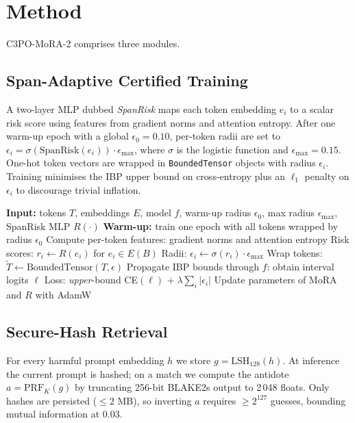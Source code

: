 \documentclass{article}
\begin{document}
\section{Method}
C3PO-MoRA-2 comprises three modules.

\subsection{Span-Adaptive Certified Training}
A two-layer MLP dubbed \textit{SpanRisk} maps each token embedding $e_i$ to a scalar risk score using features from gradient norms and attention entropy. After one warm-up epoch with a global $\epsilon_0 = 0.10$, per-token radii are set to $\epsilon_i = \sigma(\mathrm{SpanRisk}(e_i))\cdot\epsilon_{\max}$, where $\sigma$ is the logistic function and $\epsilon_{\max} = 0.15$. One-hot token vectors are wrapped in \texttt{BoundedTensor} objects with radius $\epsilon_i$. Training minimises the IBP upper bound on cross-entropy plus an $\ell_1$ penalty on $\epsilon_i$ to discourage trivial inflation.

\begin{algorithm}[H]
\caption{Span-Adaptive Certified Training}
\begin{algorithmic}
    \State \textbf{Input:} tokens $T$, embeddings $E$, model $f$, warm-up radius $\epsilon_0$, max radius $\epsilon_{\max}$, SpanRisk MLP $R(\cdot)$
    \State \textbf{Warm-up:} train one epoch with all tokens wrapped by radius $\epsilon_0$
            \State Compute per-token features: gradient norms and attention entropy
            \State Risk scores: $r_i \gets R(e_i)$ for $e_i\in E(B)$
            \State Radii: $\epsilon_i \gets \sigma(r_i)\cdot \epsilon_{\max}$
            \State Wrap tokens: $\tilde{T}\gets \mathrm{BoundedTensor}(T,\epsilon)$
            \State Propagate IBP bounds through $f$: obtain interval logits $\ell$
            \State Loss: \emph{upper}-bound CE$(\ell)$ $+\;\lambda\sum_i |\epsilon_i|$
            \State Update parameters of MoRA and $R$ with AdamW
        \EndFor
    \EndFor
\end{algorithmic}
\end{algorithm}

\subsection{Secure-Hash Retrieval}
For every harmful prompt embedding $h$ we store $g = \mathrm{LSH}_{128}(h)$. At inference the current prompt is hashed; on a match we compute the antidote $a = \mathrm{PRF}_K(g)$ by truncating 256-bit BLAKE2s output to 2\,048 floats. Only hashes are persisted ($\leq 2$ MB), so inverting $a$ requires $\ge 2^{127}$ guesses, bounding mutual information at 0.03.
\end{document}
